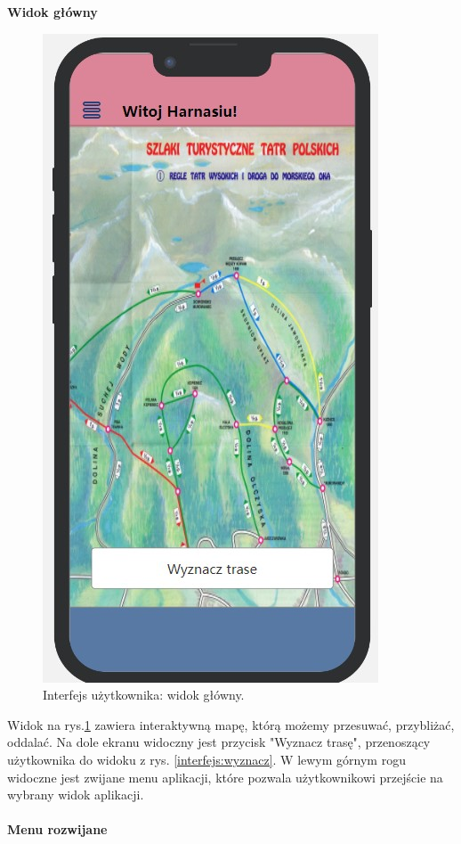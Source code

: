     \newpage
    \textbf{Widok główny} 
     \begin{figure}[H]
        \centering
        \includegraphics[scale=0.5]{img/interfejsy/if_główna.jpg}
        \caption{Interfejs użytkownika: widok główny.}
        \label{interfejs:glowny}
    \end{figure}
    Widok na rys.\ref{interfejs:glowny} zawiera interaktywną mapę, którą możemy przesuwać, przybliżać, oddalać. Na dole ekranu widoczny jest przycisk "Wyznacz trasę", przenoszący użytkownika do widoku z rys. \ref{interfejs:wyznacz}. W lewym górnym rogu widoczne jest zwijane menu aplikacji, które pozwala użytkownikowi przejście na wybrany widok aplikacji. \\
    \\
    \textbf{Menu rozwijane} 
